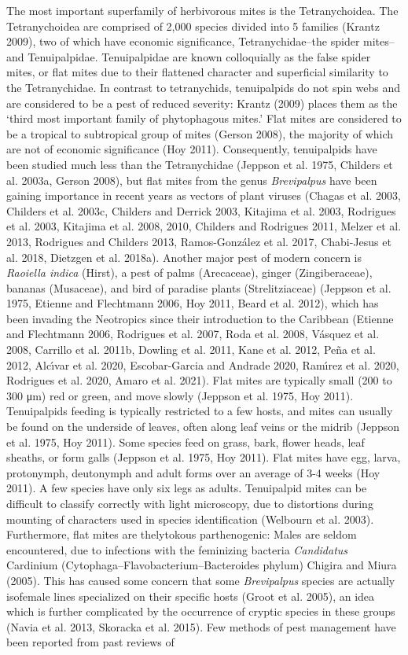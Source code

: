 \documentclass[12pt,final,CPage]{ufthesis}
\begin{document}
{  The most important superfamily of herbivorous mites is the Tetranychoidea. The Tetranychoidea are comprised of 2,000 species divided into 5 families (Krantz 2009), two of which have economic significance, Tetranychidae--the spider mites--and Tenuipalpidae. Tenuipalpidae are known colloquially as the false spider mites, or flat mites due to their flattened character and superficial similarity to the Tetranychidae. In contrast to tetranychids, tenuipalpids do not spin webs and are considered to be a pest of reduced severity: Krantz (2009) places them as the `third most important family of phytophagous mites.' Flat mites are considered to be a tropical to subtropical group of mites (Gerson 2008), the majority of which are not of economic significance (Hoy 2011). Consequently, tenuipalpids have been studied much less than the Tetranychidae (Jeppson et al. 1975, Childers et al. 2003a, Gerson 2008), but flat mites from the genus \emph{Brevipalpus} have been gaining importance in recent years as vectors of plant viruses (Chagas et al. 2003, Childers et al. 2003c, Childers and Derrick 2003, Kitajima et al. 2003, Rodrigues et al. 2003, Kitajima et al. 2008, 2010, Childers and Rodrigues 2011, Melzer et al. 2013, Rodrigues and Childers 2013, Ramos-González et al. 2017, Chabi-Jesus et al. 2018, Dietzgen et al. 2018a). Another major pest of modern concern is \emph{Raoiella indica} (Hirst), a pest of palms (Arecaceae), ginger (Zingiberaceae), bananas (Musaceae), and bird of paradise plants (Strelitziaceae) (Jeppson et al. 1975, Etienne and Flechtmann 2006, Hoy 2011, Beard et al. 2012), which has been invading the Neotropics since their introduction to the Caribbean (Etienne and Flechtmann 2006, Rodrigues et al. 2007, Roda et al. 2008, Vásquez et al. 2008, Carrillo et al. 2011b, Dowling et al. 2011, Kane et al. 2012, Peña et al. 2012, Alcı́var et al. 2020, Escobar-Garcia and Andrade 2020, Ramı́rez et al. 2020, Rodrigues et al. 2020, Amaro et al. 2021). Flat mites are typically small (200 to 300 \si{\micro\metre}) red or green, and move slowly (Jeppson et al. 1975, Hoy 2011). Tenuipalpids feeding is typically restricted to a few hosts, and mites can usually be found on the underside of leaves, often along leaf veins or the midrib (Jeppson et al. 1975, Hoy 2011). Some species feed on grass, bark, flower heads, leaf sheaths, or form galls (Jeppson et al. 1975, Hoy 2011). Flat mites have egg, larva, protonymph, deutonymph and adult forms over an average of 3-4 weeks (Hoy 2011). A few species have only six legs as adults. Tenuipalpid mites can be difficult to classify correctly with light microscopy, due to distortions during mounting of characters used in species identification (Welbourn et al. 2003). Furthermore, flat mites are thelytokous parthenogenic: Males are seldom encountered, due to infections with the feminizing bacteria \emph{Candidatus} Cardinium (Cytophaga--Flavobacterium--Bacteroides phylum) Chigira and Miura (2005). This has caused some concern that some \emph{Brevipalpus} species are actually isofemale lines specialized on their specific hosts (Groot et al. 2005), an idea which is further complicated by the occurrence of cryptic species in these groups (Navia et al. 2013, Skoracka et al. 2015). Few methods of pest management have been reported from past reviews of }
\end{document}
